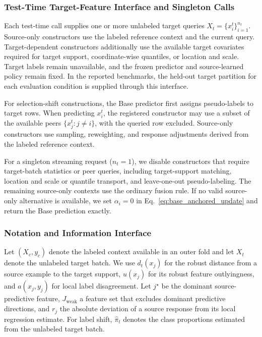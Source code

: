 \subsubsection{Test-Time Target-Feature Interface and Singleton Calls}
\label{app:test_time_batch_interface}

Each test-time call supplies one or more unlabeled target queries
$X_t=\{x_i^t\}_{i=1}^{n_t}$. Source-only constructors use the labeled reference
context and the current query. Target-dependent constructors additionally use
the available target covariates required for target support, coordinate-wise
quantiles, or location and scale. Target labels remain unavailable, and the
frozen predictor and source-learned policy remain fixed. In the reported
benchmarks, the held-out target partition for each evaluation condition is
supplied through this interface.

For selection-shift constructions, the Base predictor first assigns
pseudo-labels to target rows. When predicting $x_i^t$, the registered
constructor may use a subset of the available peers
$\{x_j^t:j\ne i\}$, with the queried row excluded. Source-only
constructors use sampling, reweighting, and response adjustments derived from
the labeled reference context.

For a singleton streaming request ($n_t=1$), we disable constructors that
require target-batch statistics or peer queries, including target-support
matching, location and scale or quantile transport, and leave-one-out
pseudo-labeling.  The remaining source-only contexts use the ordinary fusion
rule.  If no valid source-only alternative is available, we set
$\alpha_i=0$ in Eq.~\eqref{eq:base_anchored_update} and return the Base
prediction exactly.



\iffalse
\subsubsection{Notation and Information Interface}

Let $(X_c,y_c)$ denote the labeled context available in an outer fold and let
$X_t$ denote the unlabeled target batch.  We use $d_t(x_j)$ for the robust
distance from a source example to the target support, $u(x_j)$ for its robust
feature outlyingness, and $a(x_j,y_j)$ for local label disagreement.  Let
$j^\star$ be the dominant source-predictive feature, $J_{\mathrm{weak}}$ a
feature set that excludes dominant predictive directions, and $r_j$ the
absolute deviation of a source response from its local regression estimate.
For label shift, $\hat\pi_t$ denotes the class proportions estimated from the
unlabeled target batch.

